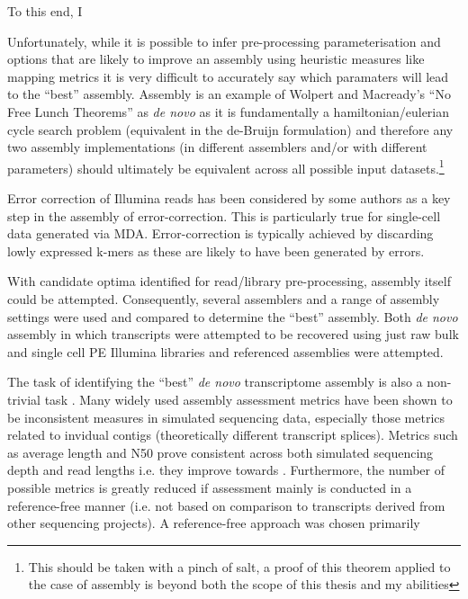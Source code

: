 To this end, I 






Unfortunately, while it is possible to infer pre-processing parameterisation and options that
are likely to improve an assembly using heuristic measures like mapping metrics
it is very difficult to accurately say which paramaters 
will lead to the ``best'' assembly.  Assembly is an example of
Wolpert and Macready's ``No Free Lunch Theorems'' \citep{Wolpert1995,Wolpert1997} 
as \textit{de novo} as it is fundamentally a hamiltonian/eulerian cycle search problem (equivalent
    in the de-Bruijn formulation) and therefore any two assembly implementations (in different assemblers and/or
    with different parameters) should ultimately be equivalent across all possible input datasets.\footnote{
    This should be taken with a pinch of salt, a proof of this theorem applied to the case of assembly is beyond
both the scope of this thesis and my abilities}





Error correction of Illumina reads has been considered by some authors as a key
step in the assembly of error-correction.  This is particularly true for single-cell
data generated via MDA. 
Error-correction is typically achieved by discarding lowly expressed k-mers 
as these are likely to have been generated by errors.









With candidate optima identified for read/library pre-processing, assembly itself could be 
attempted.  Consequently, several assemblers and a range of assembly settings were 
used and compared to determine the ``best'' assembly.   Both \textit{de novo} assembly
in which transcripts were attempted to be recovered using just raw bulk and single cell
PE Illumina libraries and referenced assemblies were attempted.







The task of identifying the ``best'' \textit{de novo} transcriptome assembly is also a non-trivial 
task \citep{Neil2013}.  Many widely used assembly assessment metrics have been shown to be
inconsistent measures in simulated sequencing data, especially those metrics related to invidual
contigs (theoretically different transcript splices).  Metrics such as average length and N50
prove consistent across both simulated sequencing depth and read lengths i.e. they improve 
towards \citep{Neil2013}.  Furthermore, the number of possible metrics is greatly reduced
if assessment mainly is conducted in a reference-free manner (i.e. not based on comparison
to transcripts derived from other sequencing projects).   A reference-free approach was chosen
primarily 










